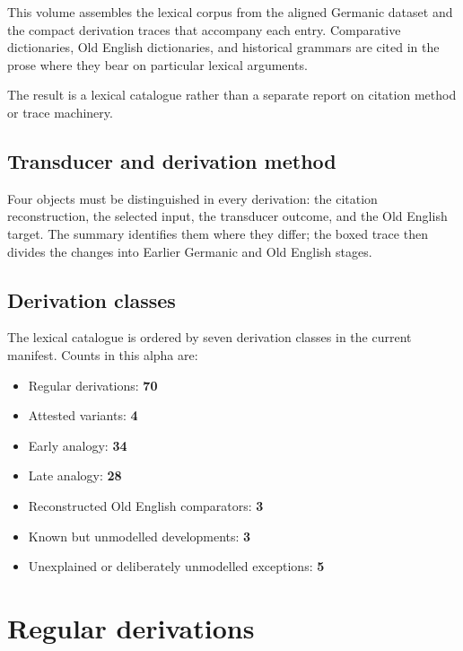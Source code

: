 \documentclass[
  british,
  a4paper,
  openany]{book}
\providecommand{\tightlist}{%
  \setlength{\itemsep}{0pt}\setlength{\parskip}{0pt}}
\begin{document}
This volume assembles the lexical corpus from the aligned Germanic
dataset and the compact derivation traces that accompany each entry.
Comparative dictionaries, Old English dictionaries, and historical
grammars are cited in the prose where they bear on particular lexical
arguments.

The result is a lexical catalogue rather than a separate report on
citation method or trace machinery.

\section*{Transducer and derivation
method}\label{transducer-and-derivation-method}

Four objects must be distinguished in every derivation: the citation
reconstruction, the selected input, the transducer outcome, and the Old
English target. The summary identifies them where they differ; the boxed
trace then divides the changes into Earlier Germanic and Old English
stages.

\section*{Derivation classes}\label{derivation-classes}

The lexical catalogue is ordered by seven derivation classes in the
current manifest. Counts in this alpha are:

\begin{itemize}
\tightlist
\item
  Regular derivations: \textbf{70}
\item
  Attested variants: \textbf{4}
\item
  Early analogy: \textbf{34}
\item
  Late analogy: \textbf{28}
\item
  Reconstructed Old English comparators: \textbf{3}
\item
  Known but unmodelled developments: \textbf{3}
\item
  Unexplained or deliberately unmodelled exceptions: \textbf{5}
\end{itemize}

\clearpage

\chapter{Regular derivations}\label{regular-derivations}
\end{document}
